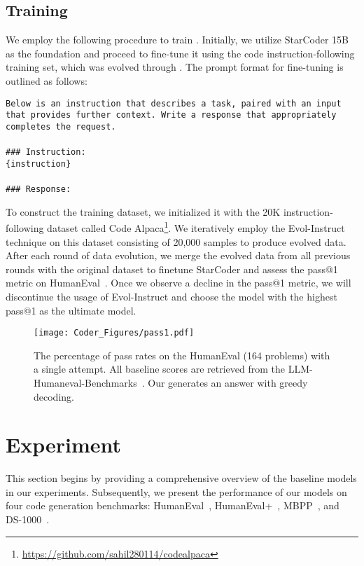 \subsection{Training \modelname{}}
We employ the following procedure to train \modelname{}. Initially, we utilize StarCoder 15B~\cite{li2023starcoder} as the foundation and proceed to fine-tune it using the code instruction-following training set, which was evolved through \name{}. The prompt format for fine-tuning is outlined as follows:
\begin{boxEnv}
\texttt{Below is an instruction that describes a task, paired with an input that provides further context. Write a response that appropriately completes the request. \\\\\#\#\# Instruction:\\ \{instruction\}\\ \\\#\#\# Response:}
\end{boxEnv}
To construct the training dataset, we initialized it with the 20K instruction-following dataset called Code Alpaca\footnote{\url{https://github.com/sahil280114/codealpaca}}. We iteratively employ the Evol-Instruct technique on this dataset consisting of 20,000 samples to produce evolved data. After each round of data evolution, we merge the evolved data from all previous rounds with the original dataset to finetune StarCoder and assess the pass@1 metric on HumanEval~\cite{humeval}. Once we observe a decline in the pass@1 metric, we will discontinue the usage of Evol-Instruct and choose the model with the highest pass@1 as the ultimate model.\begin{figure}
\centering
     \texttt{[image: Coder\_Figures/pass1.pdf]}
     \caption{The percentage of pass rates on the HumanEval (164 problems) with a single attempt. All baseline scores are retrieved from the LLM-Humaneval-Benchmarks~\cite{llm-humaneval-benchmarks}. Our \modelname{} generates an answer with greedy decoding.}
     \label{fig:pass1}
\end{figure}

\section{Experiment}

This section begins by providing a comprehensive overview of the baseline models in our experiments. Subsequently, we present the performance of our models on four code generation benchmarks: HumanEval~\cite{humeval}, HumanEval+~\cite{humanevalp}, MBPP~\cite{MBPP}, and DS-1000~\cite{DS1000}.

